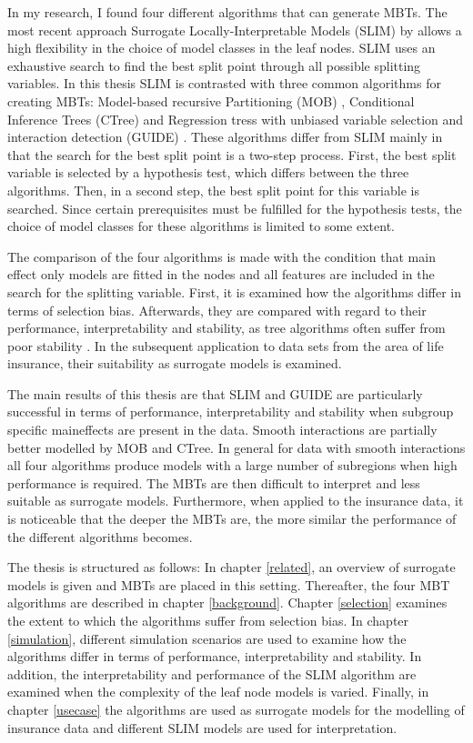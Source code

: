 In my research, I found four different algorithms that can generate MBTs. 
The most recent approach Surrogate Locally-Interpretable Models (SLIM) by \cite{Hu.2020} allows a high flexibility in the choice of model classes in the leaf nodes. SLIM uses an exhaustive search to find the best split point through all possible splitting variables. 
In this thesis SLIM is contrasted with three common algorithms for creating MBTs: Model-based recursive Partitioning (MOB) \citep{Zeileis.2008}, Conditional Inference Trees (CTree) \citep{Hothorn.2006} and Regression tress with unbiased variable selection and interaction detection (GUIDE) \citep{Loh.2002}. These algorithms differ from SLIM mainly in that the search for the best split point is a two-step process. First, the best split variable is selected by a hypothesis test, which differs between the three algorithms. Then, in a second step, the best split point for this variable is searched. Since certain prerequisites must be fulfilled for the hypothesis tests, the choice of model classes for these algorithms is limited to some extent. 

The comparison of the four algorithms is made with the condition that main effect only models are fitted in the nodes and all features are included in the search for the splitting variable. First, it is examined how the algorithms differ in terms of selection bias. Afterwards, they are compared with regard to their performance, interpretability and stability, as tree algorithms often suffer from poor stability \citep{Fokkema.2020}. In the subsequent application to data sets from the area of life insurance, their suitability as surrogate models is examined.

The main results of this thesis are that SLIM and GUIDE are particularly successful in terms of performance, interpretability and stability when subgroup specific maineffects are present in the data. Smooth interactions are partially better modelled by MOB and CTree. In general for data with smooth interactions all four algorithms produce models with a large number of subregions when high performance is required. The MBTs are then difficult to interpret and less suitable as surrogate models. Furthermore, when applied to the insurance data, it is noticeable that the deeper the MBTs are, the more similar the performance of the different algorithms becomes.

The thesis is structured as follows:
In chapter \ref{related}, an overview of surrogate models is given and MBTs are placed in this setting. Thereafter, the four MBT algorithms are described in chapter \ref{background}. Chapter \ref{selection} examines the extent to which the algorithms suffer from selection bias. In chapter \ref{simulation}, different simulation scenarios are used to examine how the algorithms differ in terms of performance, interpretability and stability. In addition, the interpretability and performance of the SLIM algorithm are examined when the complexity of the leaf node models is varied. Finally, in chapter \ref{usecase} the algorithms are used as surrogate models for the modelling of insurance data and different SLIM models are used for interpretation. 

